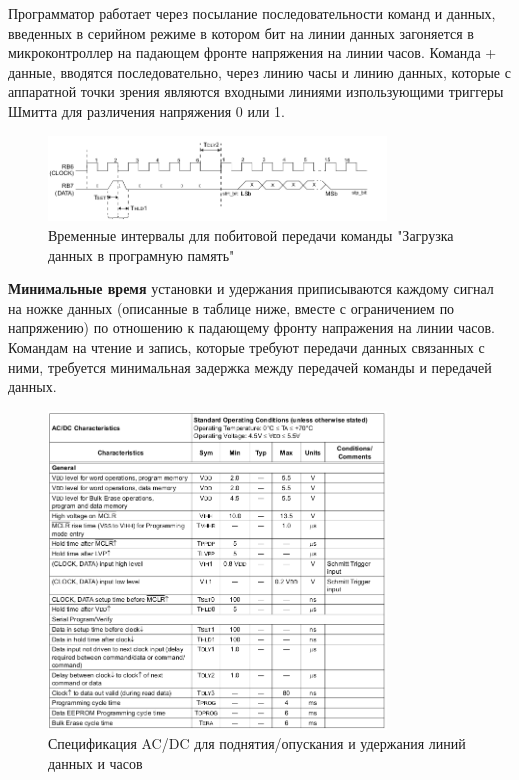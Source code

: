 Программатор работает через посылание 
последовательности команд и данных, введенных в серийном режиме
в котором бит на линии данных загоняется в микроконтроллер на падающем
фронте напряжения на линии часов. Команда + данные, вводятся последовательно, 
через линию часы и линию данных, которые с аппаратной точки зрения являются входными линиями 
изпользующими триггеры Шмитта для различения напряжения 0 или 1. 

\begin{figure}[h!]
    \centering
    \includegraphics[width=0.8\textwidth]{2017-05-09_at_09:32:56_screenshot.png}
    \caption{Временные интервалы для побитовой передачи команды "Загрузка данных в програмную память"}
\end{figure}

\newpage

\textbf{Минимальные время} установки и удержания приписываются каждому сигнал на ножке данных 
(описанные в таблице ниже, вместе с ограничением по напряжению) по
отношению к падающему фронту напражения на линии часов. Командам на чтение и запись, которые
требуют передачи данных связанных с ними,
требуется минимальная задержка между передачей команды и передачей данных.

\begin{figure}[h!]
    \centering
    \includegraphics[width=0.8\textwidth]{2017-05-08_at_03:39:19_screenshot.png}
    \caption{Спецификация AC/DC для поднятия/опускания и удержания линий данных и часов}
\end{figure}


